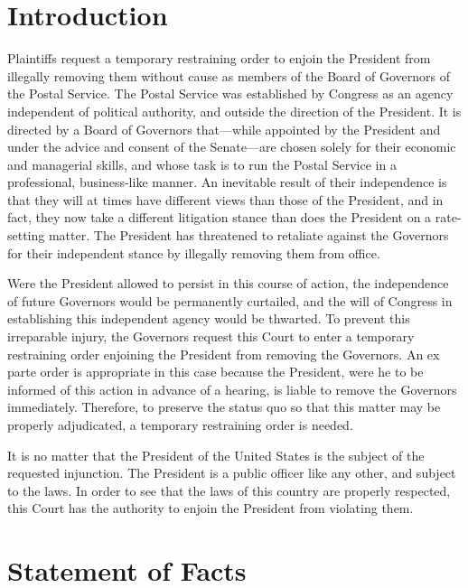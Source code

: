 \documentclass[12pt,\documentclassflag]{complaint}
\begin{document}
\section{Introduction}
\doublespacing


Plaintiffs request a temporary restraining order to enjoin the President from illegally removing them without cause as members of the Board of Governors of the Postal Service.  The Postal Service was established by Congress as an agency independent of political authority, and outside the direction of the President.  It is directed by a Board of Governors that---while appointed by the President and under the advice and consent of the Senate---are chosen solely for their economic and managerial skills, and whose task is to run the Postal Service in a professional, business-like manner.  An inevitable result of their independence is that they will at times have different views than those of the President, and in fact, they now take a different litigation stance than does the President on a rate-setting matter.  The President has threatened to retaliate against the Governors for their independent stance by illegally removing them from office.  

Were the President allowed to persist in this course of action, the independence of future Governors would be permanently curtailed, and the will of Congress in establishing this independent agency would be thwarted.  To prevent this irreparable injury, the Governors request this Court to enter a temporary restraining order enjoining the President from removing the Governors.  An ex parte order is appropriate in this case because the President, were he to be informed of this action in advance of a hearing, is liable to remove the Governors immediately. Therefore, to preserve the status quo so that this matter may be properly adjudicated, a temporary restraining order is needed.  

It is no matter that the President of the United States is the subject of the requested injunction.  The President is a public officer like any other, and subject to the laws.  In order to see that the laws of this country are properly respected, this Court has the authority to enjoin the President from violating them.   
 
\section{Statement of Facts}
\end{document}
